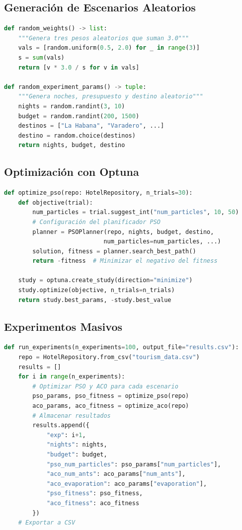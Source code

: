 \documentclass{article}
\begin{document}
\subsection{Generación de Escenarios Aleatorios}
\begin{lstlisting}[language=Python, caption=Generación de parámetros aleatorios]
def random_weights() -> list:
    """Genera tres pesos aleatorios que suman 3.0"""
    vals = [random.uniform(0.5, 2.0) for _ in range(3)]
    s = sum(vals)
    return [v * 3.0 / s for v in vals]

def random_experiment_params() -> tuple:
    """Genera noches, presupuesto y destino aleatorio"""
    nights = random.randint(3, 10)
    budget = random.randint(200, 1500)
    destinos = ["La Habana", "Varadero", ...]
    destino = random.choice(destinos)
    return nights, budget, destino
\end{lstlisting}

\subsection{Optimización con Optuna}
\begin{lstlisting}[language=Python, caption=Optimización de parámetros para PSO]
def optimize_pso(repo: HotelRepository, n_trials=30):
    def objective(trial):
        num_particles = trial.suggest_int("num_particles", 10, 50)
        # Configuración del planificador PSO
        planner = PSOPlanner(repo, nights, budget, destino, 
                            num_particles=num_particles, ...)
        solution, fitness = planner.search_best_path()
        return -fitness  # Minimizar el negativo del fitness
        
    study = optuna.create_study(direction="minimize")
    study.optimize(objective, n_trials=n_trials)
    return study.best_params, -study.best_value
\end{lstlisting}

\subsection{Experimentos Masivos}
\begin{lstlisting}[language=Python, caption=Ejecución de múltiples experimentos]
def run_experiments(n_experiments=100, output_file="results.csv"):
    repo = HotelRepository.from_csv("tourism_data.csv")
    results = []
    for i in range(n_experiments):
        # Optimizar PSO y ACO para cada escenario
        pso_params, pso_fitness = optimize_pso(repo)
        aco_params, aco_fitness = optimize_aco(repo)
        # Almacenar resultados
        results.append({
            "exp": i+1,
            "nights": nights,
            "budget": budget,
            "pso_num_particles": pso_params["num_particles"],
            "aco_num_ants": aco_params["num_ants"],
            "aco_evaporation": aco_params["evaporation"],
            "pso_fitness": pso_fitness,
            "aco_fitness": aco_fitness
        })
    # Exportar a CSV
\end{lstlisting}
\end{document}

